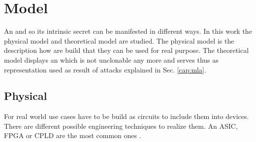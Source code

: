 \section{Model}

An \apuf and so its intrinsic secret can be manifested in different ways.
In this work the physical model and theoretical model are studied.
The physical model is the description how \apufs are build that they can be used for real purpose.
The theoretical model displays an \apuf which is not unclonable any more and serves thus as representation used as result of attacks explained in Sec. \ref{cap:mla}.

\subsection{Physical}
\label{sec:physical}

For real world use cases \apufs have to be build as circuits to include them into devices.
There are different possible engineering techniques to realize them.
An \ac{ASIC}, \ac{FPGA} or \ac{CPLD} are the most common ones \cite{Maes2012ExperimentalCMOS} \cite{Majzoobi2010FPGALines} \cite{Soybali2011ImplementationFPGA} \cite{Tajik2014PhysicalPUFs}.

